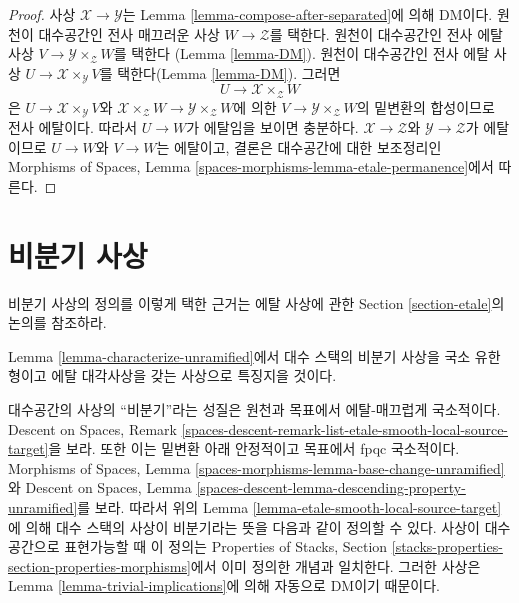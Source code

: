 \begin{proof}
사상 $\mathcal{X} \to \mathcal{Y}$는 Lemma
\ref{lemma-compose-after-separated}에 의해 DM이다. 원천이 대수공간인
전사 매끄러운 사상 $W \to \mathcal{Z}$를 택한다. 원천이 대수공간인
전사 에탈 사상 $V \to \mathcal{Y} \times_\mathcal{Z} W$를 택한다
(Lemma \ref{lemma-DM}). 원천이 대수공간인 전사 에탈 사상
$U \to \mathcal{X} \times_\mathcal{Y} V$를 택한다(Lemma
\ref{lemma-DM}). 그러면
$$
U \longrightarrow \mathcal{X} \times_\mathcal{Z} W
$$
은 $U \to \mathcal{X} \times_\mathcal{Y} V$와
$\mathcal{X} \times_\mathcal{Z} W \to
\mathcal{Y} \times_\mathcal{Z} W$에 의한
$V \to \mathcal{Y} \times_\mathcal{Z} W$의 밑변환의 합성이므로 전사
에탈이다. 따라서 $U \to W$가 에탈임을 보이면 충분하다.
$\mathcal{X} \to \mathcal{Z}$와 $\mathcal{Y} \to \mathcal{Z}$가
에탈이므로 $U \to W$와 $V \to W$는 에탈이고, 결론은 대수공간에 대한
보조정리인 Morphisms of Spaces, Lemma
\ref{spaces-morphisms-lemma-etale-permanence}에서 따른다.
\end{proof}








\section{비분기 사상}
\label{section-unramified}

\noindent
비분기 사상의 정의를 이렇게 택한 근거는 에탈 사상에 관한 Section
\ref{section-etale}의 논의를 참조하라.

\medskip\noindent
Lemma \ref{lemma-characterize-unramified}에서 대수 스택의 비분기 사상을
국소 유한형이고 에탈 대각사상을 갖는 사상으로 특징지을 것이다.

\medskip\noindent
대수공간의 사상의 ``비분기''라는 성질은 원천과 목표에서 에탈-매끄럽게
국소적이다. Descent on Spaces, Remark
\ref{spaces-descent-remark-list-etale-smooth-local-source-target}을 보라.
또한 이는 밑변환 아래 안정적이고 목표에서 fpqc 국소적이다. Morphisms of
Spaces, Lemma \ref{spaces-morphisms-lemma-base-change-unramified}와 Descent
on Spaces, Lemma \ref{spaces-descent-lemma-descending-property-unramified}를
보라. 따라서 위의 Lemma
\ref{lemma-etale-smooth-local-source-target}에 의해 대수 스택의 사상이
비분기라는 뜻을 다음과 같이 정의할 수 있다.
사상이 대수공간으로 표현가능할 때 이 정의는 Properties of Stacks,
Section \ref{stacks-properties-section-properties-morphisms}에서 이미 정의한
개념과 일치한다. 그러한 사상은 Lemma \ref{lemma-trivial-implications}에
의해 자동으로 DM이기 때문이다.

